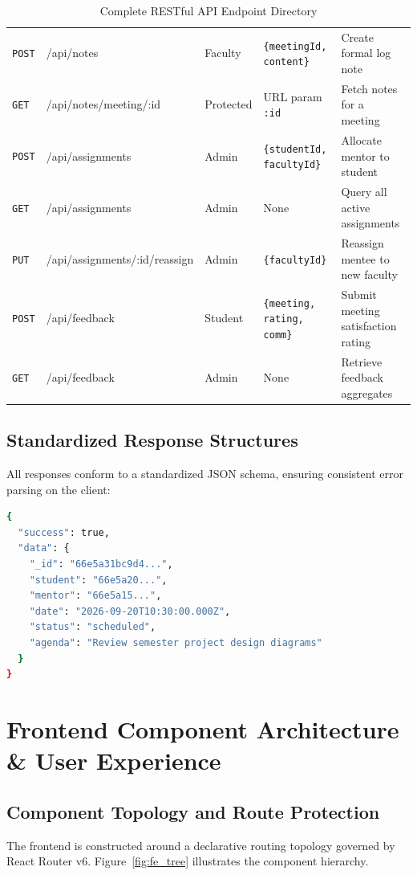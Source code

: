 \documentclass[11pt,a4paper]{article}
\begin{document}
\begin{table}[H]
\begin{tabularx}{\textwidth}{@{}p{1.0cm}>{\ttfamily\raggedright}p{4.6cm}p{1.3cm}>{\raggedright}p{2.8cm}X@{}}
\midrule
\texttt{POST} & /api/notes & Faculty & \texttt{\{meetingId, content\}} & Create formal log note \\
\texttt{GET} & /api/notes/meeting/:id & Protected & URL param \texttt{:id} & Fetch notes for a meeting \\
\midrule
\texttt{POST} & /api/assignments & Admin & \texttt{\{studentId, facultyId\}} & Allocate mentor to student \\
\texttt{GET} & /api/assignments & Admin & None & Query all active assignments \\
\texttt{PUT} & /api/assignments/:id/reassign & Admin & \texttt{\{facultyId\}} & Reassign mentee to new faculty \\
\midrule
\texttt{POST} & /api/feedback & Student & \texttt{\{meeting, rating, comm\}} & Submit meeting satisfaction rating \\
\texttt{GET} & /api/feedback & Admin & None & Retrieve feedback aggregates \\
\bottomrule
\end{tabularx}
\caption{Complete RESTful API Endpoint Directory}
\label{tab:api}
\end{table}

\subsection{Standardized Response Structures}
All responses conform to a standardized JSON schema, ensuring consistent error parsing on the client:
\begin{lstlisting}[language=bash, caption={Sample Successful JSON Response Structure}]
{
  "success": true,
  "data": {
    "_id": "66e5a31bc9d4...",
    "student": "66e5a20...",
    "mentor": "66e5a15...",
    "date": "2026-09-20T10:30:00.000Z",
    "status": "scheduled",
    "agenda": "Review semester project design diagrams"
  }
}
\end{lstlisting}

\section{Frontend Component Architecture \& User Experience}

\subsection{Component Topology and Route Protection}
The frontend is constructed around a declarative routing topology governed by React Router v6. Figure~\ref{fig:fe_tree} illustrates the component hierarchy.
\end{document}
